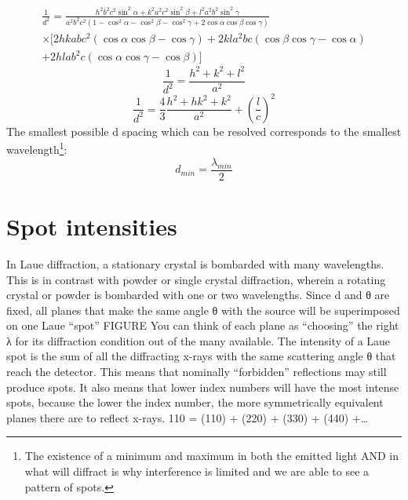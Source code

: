 \begin{multline}
    \frac{1}{d^2}=\frac{h^2b^2c^2\sin^2{\alpha}+k^2a^2c^2\sin^2{\beta}+l^2a^2b^2\sin^2{\gamma}}{a^2b^2c^2(1-\cos^2{\alpha}-\cos^2{\beta}-\cos^2{\gamma}+2\cos{\alpha}\cos{\beta}\cos{\gamma})}\\\times[2hkabc^2(\cos{\alpha}\cos{\beta}-\cos{\gamma})+2kla^2bc(\cos{\beta}\cos{\gamma}-\cos{\alpha})\\+2hlab^2c(\cos{\alpha}\cos{\gamma}-\cos{\beta})]
    \label{latticeplanespacinggeneral}
    \end{multline}
\begin{equation}
    \frac{1}{d^2}=\frac{h^2+k^2+l^2}{a^2}
    \label{latticeplanespacingcubic}
\end{equation}
\begin{equation}
    \frac{1}{d^2}=\frac{4}{3}\frac{h^2+hk^2+k^2}{a^2}+(\frac{l}{c})^2
    \label{latticeplanespacinghexagonal}
\end{equation}
The smallest possible d spacing which can be resolved corresponds to the smallest wavelength\footnote{The existence of a minimum and maximum in both the emitted light AND in what will diffract is why interference is limited and we are able to see a pattern of spots.}:
\begin{equation}
    d_{min}=\frac{\lambda_{min}}{2}
    \label{minspacing}
\end{equation}
\section{Spot intensities}
In Laue diffraction, a stationary crystal is bombarded with many wavelengths. This is in contrast with powder or single crystal diffraction, wherein a rotating crystal or powder is bombarded with one or two wavelengths. Since d and θ are fixed, all planes that make the same angle θ with the source will be superimposed on one Laue “spot” FIGURE
You can think of each plane as “choosing” the right λ for its diffraction condition out of the many available. The intensity of a Laue spot is the sum of all the diffracting x-rays with the same scattering angle θ that reach the detector.
This means that nominally “forbidden” reflections may still produce spots.
It also means that lower index numbers will have the most intense spots, because the lower the index number, the more symmetrically equivalent planes there are to reflect x-rays.
{110} = (110) + (220) + (330) + (440) +…
